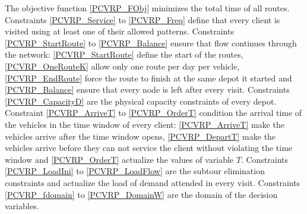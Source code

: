 \documentclass[preprint,review,12pt]{elsarticle}
\begin{document}
The objective function \eqref{PCVRP_FObj} minimizes the total time of all routes. Constraints \eqref{PCVRP_Service} to \eqref{PCVRP_Freq} define that every client is visited using at least one of their allowed patterns. Constraints \eqref{PCVRP_StartRoute} to \eqref{PCVRP_Balance} ensure that flow continues through the network: \eqref{PCVRP_StartRoute} define the start of the routes, \eqref{PCVRP_OneRouteK} allow only one route per day per vehicle, \eqref{PCVRP_EndRoute} force the route to finish at the same depot it started and \eqref{PCVRP_Balance} ensure that every node is left after every visit. Constraints \eqref{PCVRP_CapacityD} are the physical capacity constraints of every depot. Constraint \eqref{PCVRP_ArriveT} to \eqref{PCVRP_OrderT} condition the arrival time of the vehicles in the time window of every client: \eqref{PCVRP_ArriveT} make the vehicles arrive after the time window opens, \eqref{PCVRP_DepartT} make the vehicles arrive before they can not service the client without violating the time window and \eqref{PCVRP_OrderT} actualize the values of variable $T$. Constraints \eqref{PCVRP_LoadIni} to \eqref{PCVRP_LoadFlow} are the subtour elimination constraints and actualize the load of demand attended in every visit. Constraints \eqref{PCVRP_fdomain} to \eqref{PCVRP_DomainW} are the domain of the decision variables.
\end{document}
